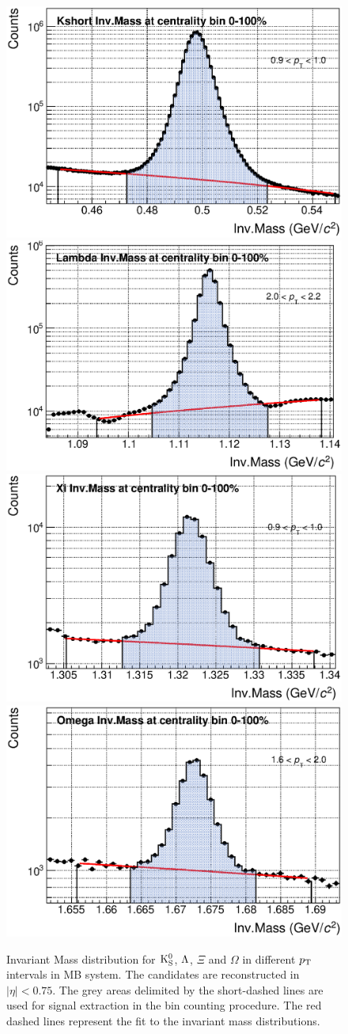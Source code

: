\begin{figure}[!ht]
	\begin{center}
		\includegraphics[width=.4\textwidth]{figures/Kshort_InvM_0100_4}
        \includegraphics[width=.4\textwidth]{figures/Lambda_InvM_0100_11}
        \includegraphics[width=.4\textwidth]{figures/Xi_InvM_0100_4}
        \includegraphics[width=.4\textwidth]{figures/Omega_InvM_0100_5}
		\caption{Invariant Mass distribution for ${\rm K}^{0}_{\rm{S}}$, $\Lambda$, $\Xi$ and $\Omega$ in different $p_{\rm T}$ intervals in MB \pPb system. The candidates are reconstructed in $|\eta|<0.75$. The grey areas delimited by the short-dashed lines are used for signal extraction in the bin counting procedure. The red dashed lines represent the fit to the invariant mass distributions.}
		\label{Fig:InvM}
	\end{center}
\end{figure}

